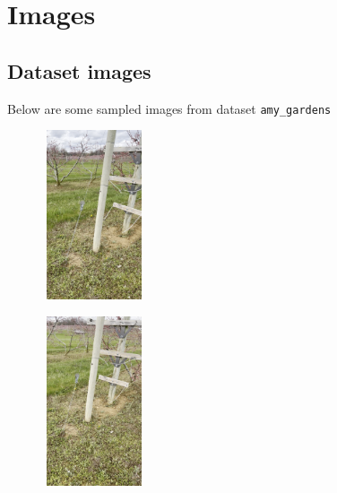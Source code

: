 \documentclass[report.tex]{subfiles}
\begin{document}
    \chapter{Images}

    \section{Dataset images} \label{appendix:A1}
    Below are some sampled images from dataset \texttt{amy\_gardens}

    \begin{figure}[htbp]
        \centering
        \begin{minipage}[t]{0.32\textwidth}
            \centering
            \includegraphics[width=3cm, height=5cm]{images/amy_gardens_dataset/peach_0004.png}
            \label{fig:amygardens1}
        \end{minipage}%
        \hfill
        \begin{minipage}[t]{0.32\textwidth}
            \centering
            \includegraphics[width=3cm, height=5cm]{images/amy_gardens_dataset/peach_0008.png}
            \label{fig:amygardens2}
        \end{minipage}
        \hfill
        \begin{minipage}[t]{0.32\textwidth}

\end{minipage}
\end{figure}
\end{document}
